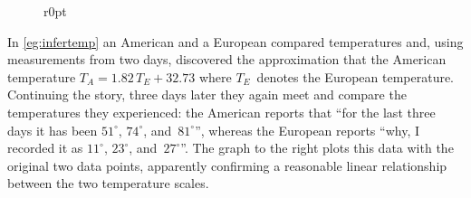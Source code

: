 \begin{figure}[8]r{0pt}
\end{figure}
\begin{example} \label{eg:infertemp2}
In \cref{eg:infertemp} an American and a European compared temperatures and, using measurements from two days, discovered the approximation that the American temperature \(T_A=1.82\,T_E+32.73\) where \(T_E\)~denotes the European temperature.
Continuing the story, three days later they again meet and compare the temperatures they experienced: the American reports that ``for the last three days it has been \(51^\circ\), \(74^\circ\), and~\(81^\circ\)'', whereas the European reports ``why, I recorded it as \(11^\circ\), \(23^\circ\), and~\(27^\circ\)''.
The graph to the right plots this data with the original two data points, apparently confirming a reasonable linear relationship between the two temperature scales.


\end{example}
